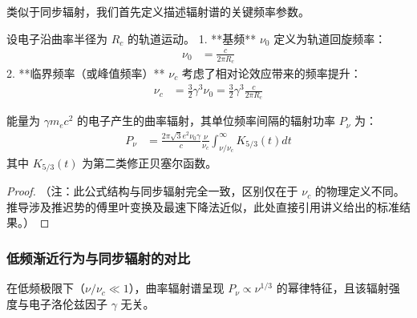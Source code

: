 类似于同步辐射，我们首先定义描述辐射谱的关键频率参数。

\begin{definition}[基频与临界频率]
设电子沿曲率半径为 $R_c$ 的轨道运动。
1. **基频** $\nu_0$ 定义为轨道回旋频率：
\begin{align}
\nu_0 &= \frac{c}{2\pi R_c} \label{eq:nu_0}
\end{align}
2. **临界频率（或峰值频率）** $\nu_c$ 考虑了相对论效应带来的频率提升：
\begin{align}
\nu_c &= \frac{3}{2}\gamma^3 \nu_0 = \frac{3}{2}\gamma^3 \frac{c}{2\pi R_c} \label{eq:nu_c}
\end{align}
\end{definition}

\begin{theorem}[单粒子曲率辐射谱功率]
能量为 $\gamma m_e c^2$ 的电子产生的曲率辐射，其单位频率间隔的辐射功率 $P_{\nu}$ 为：
\begin{align}
P_{\nu} &= \frac{2\pi\sqrt{3}e^2 \nu_0 \gamma}{c} \frac{\nu}{\nu_c} \int_{\nu/\nu_c}^{\infty} K_{5/3}(t) dt \label{eq:curvature_power}
\end{align}
其中 $K_{5/3}(t)$ 为第二类修正贝塞尔函数。
\end{theorem}

\begin{proof}
（注：此公式结构与同步辐射完全一致，区别仅在于 $\nu_c$ 的物理定义不同。推导涉及推迟势的傅里叶变换及最速下降法近似，此处直接引用讲义给出的标准结果。）
\end{proof}

\subsubsection{低频渐近行为与同步辐射的对比}


\begin{theorem}[低频谱指数与能量无关性]
在低频极限下（$\nu/\nu_c \ll 1$），曲率辐射谱呈现 $P_{\nu} \propto \nu^{1/3}$ 的幂律特征，且该辐射强度与电子洛伦兹因子 $\gamma$ 无关。
\end{theorem}

